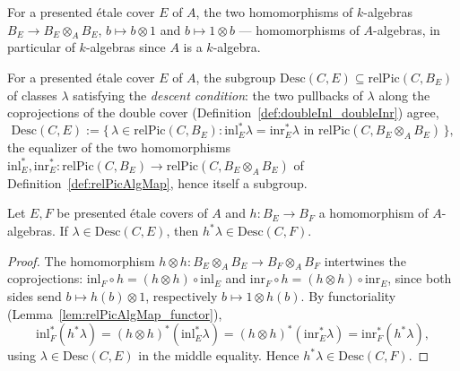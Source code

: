 \begin{definition}
  \label{def:doubleInl_doubleInr}
  \leanok
  For a presented \'etale cover \(E\) of \(A\), the two homomorphisms of \(k\)-algebras
  \(B_E \to B_E \otimes_A B_E\), \(b \mapsto b \otimes 1\) and \(b \mapsto 1 \otimes b\) ---
  homomorphisms of \(A\)-algebras, in particular of \(k\)-algebras since \(A\) is a
  \(k\)-algebra.
\end{definition}

\begin{definition}
  \label{def:descentClasses}
  \leanok
  For a presented \'etale cover \(E\) of \(A\), the subgroup
  \(\mathrm{Desc}(C,E) \subseteq \mathrm{relPic}(C,B_E)\) of classes \(\lambda\) satisfying the
  \emph{descent condition}: the two pullbacks of \(\lambda\) along the coprojections of the
  double cover (Definition~\ref{def:doubleInl_doubleInr}) agree,
  \[
    \mathrm{Desc}(C,E) := \bigl\{\, \lambda \in \mathrm{relPic}(C,B_E) : \mathrm{inl}_E^{*}
    \lambda = \mathrm{inr}_E^{*} \lambda \text{ in } \mathrm{relPic}(C, B_E \otimes_A B_E)
    \,\bigr\},
  \]
  the equalizer of the two homomorphisms \(\mathrm{inl}_E^{*}, \mathrm{inr}_E^{*} \colon
  \mathrm{relPic}(C,B_E) \to \mathrm{relPic}(C, B_E \otimes_A B_E)\) of
  Definition~\ref{def:relPicAlgMap}, hence itself a subgroup.
\end{definition}

\begin{lemma}
  \label{lem:relPicAlgMap_mem_descentClasses}
  \leanok
  Let \(E, F\) be presented \'etale covers of \(A\) and \(h \colon B_E \to B_F\) a
  homomorphism of \(A\)-algebras. If \(\lambda \in \mathrm{Desc}(C,E)\), then
  \(h^{*}\lambda \in \mathrm{Desc}(C,F)\).
\end{lemma}
\begin{proof}
  \leanok
  The homomorphism \(h \otimes h \colon B_E \otimes_A B_E \to B_F \otimes_A B_F\) intertwines
  the coprojections: \(\mathrm{inl}_F \circ h = (h \otimes h) \circ \mathrm{inl}_E\) and
  \(\mathrm{inr}_F \circ h = (h \otimes h) \circ \mathrm{inr}_E\), since both sides send
  \(b \mapsto h(b) \otimes 1\), respectively \(b \mapsto 1 \otimes h(b)\). By functoriality
  (Lemma~\ref{lem:relPicAlgMap_functor}),
  \[
    \mathrm{inl}_F^{*}(h^{*}\lambda) = (h \otimes h)^{*}(\mathrm{inl}_E^{*}\lambda)
    = (h \otimes h)^{*}(\mathrm{inr}_E^{*}\lambda) = \mathrm{inr}_F^{*}(h^{*}\lambda),
  \]
  using \(\lambda \in \mathrm{Desc}(C,E)\) in the middle equality. Hence
  \(h^{*}\lambda \in \mathrm{Desc}(C,F)\).
\end{proof}

